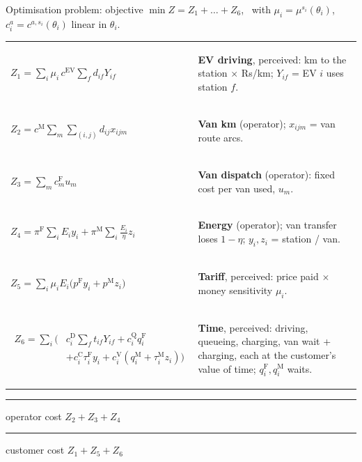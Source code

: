 \documentclass[aspectratio=169,11pt,t]{beamer}
\begin{document}
\begin{frame}{Optimisation problem: objective}
\scriptsize
\vspace{-.5ex}
$\min Z=Z_1+\dots+Z_6$, \ with $\mu_i=\mu^{s_i}(\theta_i)$, $c^a_i=c^{a,s_i}(\theta_i)$ linear in $\theta_i$.\\[.6ex]
\renewcommand{\arraystretch}{1.0}
\begin{tabular}{@{}p{}@{\hspace{2mm}}p{}@{}}
$Z_1=\sum_i \mu_i\,c^{\mathrm{EV}}\sum_{f}d_{if}Y_{if}$ &
\begin{termbox}\textbf{EV driving}, perceived: km to the station $\times$ Rs/km; $Y_{if}$ = EV $i$ uses station $f$.\end{termbox}\\[-2.5ex]
$Z_2=c^{\mathrm M}\sum_m\sum_{(i,j)}d_{ij}x_{ijm}$ &
\begin{termbox}[accA]\textbf{Van km} (operator); $x_{ijm}$ = van route arcs.\end{termbox}\\[-2.5ex]
$Z_3=\sum_m c^{\mathrm F}_m u_m$ &
\begin{termbox}[accA]\textbf{Van dispatch} (operator): fixed cost per van used, $u_m$.\end{termbox}\\[-2.5ex]
$Z_4=\pi^{\mathrm F}\sum_i E_iy_i+\pi^{\mathrm M}\sum_i\frac{E_i}{\eta}z_i$ &
\begin{termbox}[accA]\textbf{Energy} (operator); van transfer loses $1-\eta$; $y_i,z_i$ = station / van.\end{termbox}\\[-2.5ex]
$Z_5=\sum_i \mu_i E_i\big(p^{\mathrm F}y_i+p^{\mathrm M}z_i\big)$ &
\begin{termbox}\textbf{Tariff}, perceived: price paid $\times$ money sensitivity $\mu_i$.\end{termbox}\\[-2.5ex]
$\begin{aligned}Z_6=\sum_i\Big(&c^{\mathrm D}_i\textstyle\sum_f t_{if}Y_{if}+c^{\mathrm Q}_iq^{\mathrm F}_i\\[-2pt]&+c^{\mathrm C}_i\tau^{\mathrm F}_iy_i+c^{\mathrm V}_i(q^{\mathrm M}_i+\tau^{\mathrm M}_iz_i)\Big)\end{aligned}$ &
\begin{termbox}\textbf{Time}, perceived: driving, queueing, charging, van wait + charging, each at the customer's value of time; $q^{\mathrm F}_i,q^{\mathrm M}_i$ waits.\end{termbox}\\
\end{tabular}

\vspace{-.5ex}
\textcolor{accA}{\rule{6pt}{6pt}} operator cost $Z_2{+}Z_3{+}Z_4$ \quad \textcolor{accP!70}{\rule{6pt}{6pt}} customer cost $Z_1{+}Z_5{+}Z_6$
\end{frame}
\end{document}
